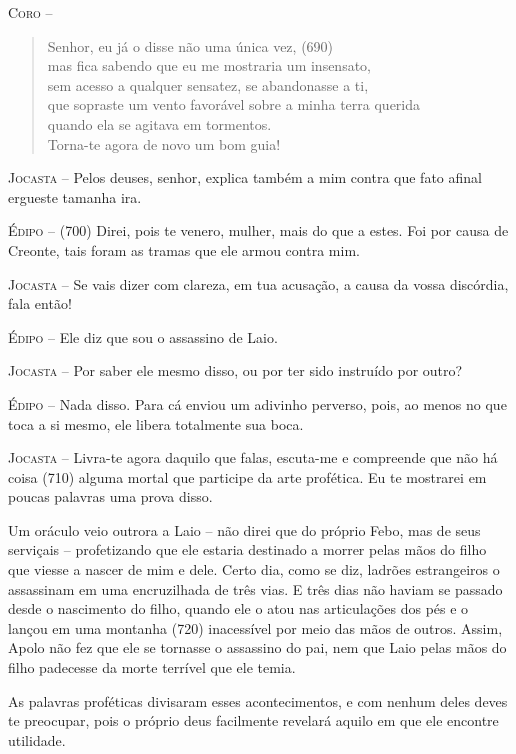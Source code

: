 \textsc{Coro} -- \begin{verse}Senhor, eu já o disse não uma única vez, (690)\\
mas fica sabendo que eu me mostraria um insensato,\\
sem acesso a qualquer sensatez, se abandonasse a ti,\\
que sopraste um vento favorável sobre a minha terra querida\\
quando ela se agitava em tormentos.\\
Torna-te agora de novo um bom guia!
\end{verse}

\textsc{Jocasta} --   Pelos deuses, senhor, explica também a mim contra que fato afinal
ergueste tamanha ira.

\textsc{Édipo} --   (700) Direi, pois te venero, mulher, mais do que a estes. Foi por causa
de Creonte, tais foram as tramas que ele armou contra mim.

\textsc{Jocasta} --   Se vais dizer com clareza, em tua acusação, a causa da vossa discórdia,
fala então!

\textsc{Édipo} --   Ele diz que sou o assassino de Laio.

\textsc{Jocasta} --   Por saber ele mesmo disso, ou por ter sido instruído por outro?

\textsc{Édipo} --   Nada disso. Para cá enviou um adivinho perverso, pois, ao menos no que
toca a si mesmo, ele libera totalmente sua boca.

\textsc{Jocasta} --   Livra-te agora daquilo que falas, escuta-me e compreende que não há
coisa (710) alguma mortal que participe da arte profética. Eu te
mostrarei em poucas palavras uma prova disso.

Um oráculo veio outrora a Laio -- não direi que do próprio Febo, mas de
seus serviçais -- profetizando que ele estaria destinado a morrer pelas
mãos do filho que viesse a nascer de mim e dele. Certo dia, como se diz,
ladrões estrangeiros o assassinam em uma encruzilhada de três vias. E
três dias não haviam se passado desde o nascimento do filho, quando ele
o atou nas articulações dos pés e o lançou em uma montanha (720)
inacessível por meio das mãos de outros. Assim, Apolo não fez que ele se
tornasse o assassino do pai, nem que Laio pelas mãos do filho padecesse
da morte terrível que ele temia.

As palavras proféticas divisaram esses acontecimentos, e com nenhum
deles deves te preocupar, pois o próprio deus facilmente revelará aquilo
em que ele encontre utilidade.

